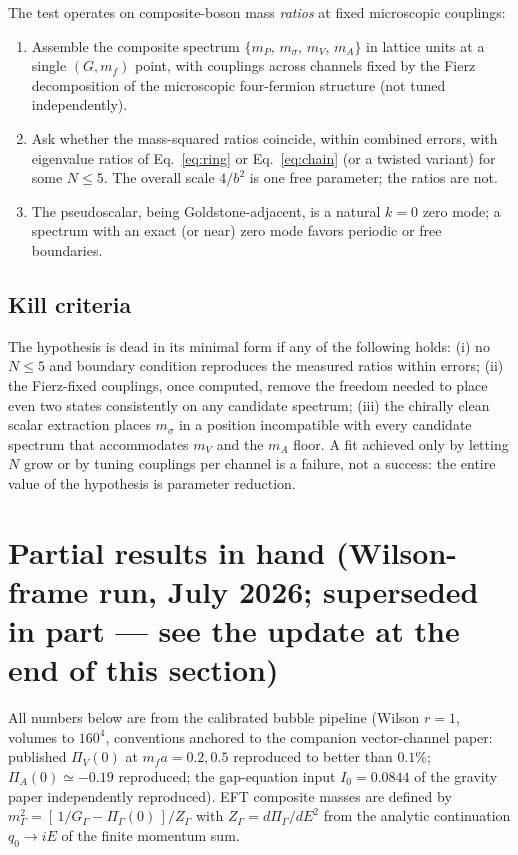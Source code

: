 \documentclass[11pt,a4paper]{article}
\begin{document}
The test operates on composite-boson mass \emph{ratios} at fixed
microscopic couplings:
\begin{enumerate}
\item Assemble the composite spectrum
$\{m_P,\, m_\sigma,\, m_V,\, m_A\}$ in lattice units at a single
$(G, m_f)$ point, with couplings across channels fixed by the
Fierz decomposition of the microscopic four-fermion structure
(not tuned independently).
\item Ask whether the mass-squared ratios coincide, within
combined errors, with eigenvalue ratios of
Eq.~\eqref{eq:ring} or Eq.~\eqref{eq:chain} (or a twisted variant)
for some $N \le 5$.
The overall scale $4/b^2$ is one free parameter; the ratios are
not.
\item The pseudoscalar, being Goldstone-adjacent, is a natural
$k=0$ zero mode; a spectrum with an exact (or near) zero mode
favors periodic or free boundaries.
\end{enumerate}

\subsection{Kill criteria}

The hypothesis is dead in its minimal form if any of the
following holds:
(i) no $N \le 5$ and boundary condition reproduces the measured
ratios within errors;
(ii) the Fierz-fixed couplings, once computed, remove the freedom
needed to place even two states consistently on any candidate
spectrum;
(iii) the chirally clean scalar extraction places $m_\sigma$ in a
position incompatible with every candidate spectrum that
accommodates $m_V$ and the $m_A$ floor.
A fit achieved only by letting $N$ grow or by tuning couplings
per channel is a failure, not a success: the entire value of the
hypothesis is parameter reduction.

\section{Partial results in hand (Wilson-frame run, July 2026;
superseded in part --- see the update at the end of this section)}
\label{sec:partial}

All numbers below are from the calibrated bubble pipeline
(Wilson $r=1$, volumes to $160^4$, conventions anchored to the
companion vector-channel paper: published $\Pi_V(0)$ at
$m_f a = 0.2, 0.5$ reproduced to better than $0.1\%$;
$\Pi_A(0) \simeq -0.19$ reproduced; the gap-equation input
$I_0 = 0.0844$ of the gravity paper independently reproduced).
EFT composite masses are defined by
$m_\Gamma^2 = [\,1/G_\Gamma - \Pi_\Gamma(0)\,]/Z_\Gamma$ with
$Z_\Gamma = d\Pi_\Gamma/dE^2$ from the analytic continuation
$q_0 \to iE$ of the finite momentum sum.
\end{document}

